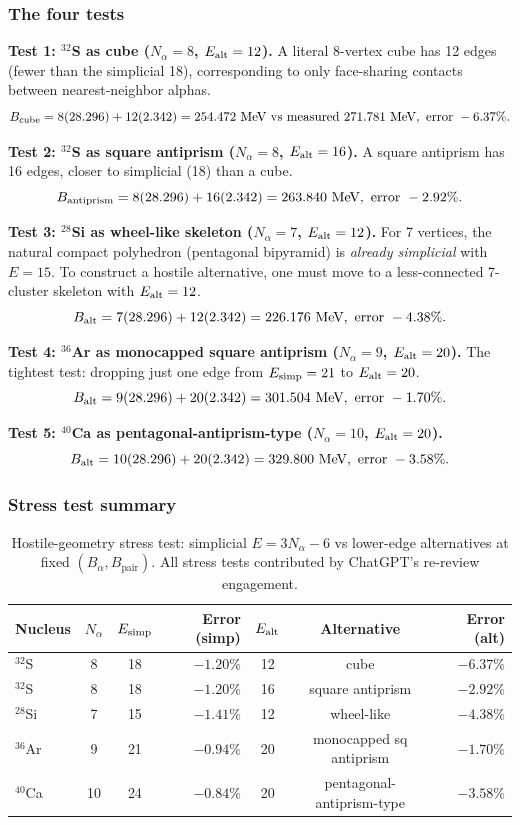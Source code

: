 \documentclass[11pt,letterpaper]{article}
\newcommand{\Bpair}{B_{\mathrm{pair}}}
\newcommand{\Balpha}{B_{\alpha}}
\newcommand{\Nalpha}{N_{\alpha}}
\begin{document}
\subsubsection{The four tests}

\textbf{Test 1: ${}^{32}$S as cube ($\Nalpha = 8$, $E_{\rm alt} = 12$).} A literal 8-vertex cube has 12 edges (fewer than the simplicial 18), corresponding to only face-sharing contacts between nearest-neighbor alphas.
\[
B_{\rm cube} = 8(28.296) + 12(2.342) = 254.472 \text{ MeV vs measured } 271.781 \text{ MeV}, \text{ error } -6.37\%.
\]

\textbf{Test 2: ${}^{32}$S as square antiprism ($\Nalpha = 8$, $E_{\rm alt} = 16$).} A square antiprism has 16 edges, closer to simplicial (18) than a cube.
\[
B_{\rm antiprism} = 8(28.296) + 16(2.342) = 263.840 \text{ MeV}, \text{ error } -2.92\%.
\]

\textbf{Test 3: ${}^{28}$Si as wheel-like skeleton ($\Nalpha = 7$, $E_{\rm alt} = 12$).} For 7 vertices, the natural compact polyhedron (pentagonal bipyramid) is \emph{already simplicial} with $E = 15$. To construct a hostile alternative, one must move to a less-connected 7-cluster skeleton with $E_{\rm alt} = 12$.
\[
B_{\rm alt} = 7(28.296) + 12(2.342) = 226.176 \text{ MeV}, \text{ error } -4.38\%.
\]

\textbf{Test 4: ${}^{36}$Ar as monocapped square antiprism ($\Nalpha = 9$, $E_{\rm alt} = 20$).} The tightest test: dropping just one edge from $E_{\rm simp} = 21$ to $E_{\rm alt} = 20$.
\[
B_{\rm alt} = 9(28.296) + 20(2.342) = 301.504 \text{ MeV}, \text{ error } -1.70\%.
\]

\textbf{Test 5: ${}^{40}$Ca as pentagonal-antiprism-type ($\Nalpha = 10$, $E_{\rm alt} = 20$).}
\[
B_{\rm alt} = 10(28.296) + 20(2.342) = 329.800 \text{ MeV}, \text{ error } -3.58\%.
\]

\subsubsection{Stress test summary}

\begin{table}[H]
\centering
\caption{Hostile-geometry stress test: simplicial $E = 3\Nalpha - 6$ vs lower-edge alternatives at fixed $(\Balpha, \Bpair)$. All stress tests contributed by ChatGPT's re-review engagement.}
\label{tab:stress_test}
\begin{tabular}{@{}lccrccr@{}}
\toprule
Nucleus & $\Nalpha$ & $E_{\rm simp}$ & Error (simp) & $E_{\rm alt}$ & Alternative & Error (alt) \\
\midrule
${}^{32}$S  & 8  & 18 & $-1.20\%$ & 12 & cube             & $-6.37\%$ \\
${}^{32}$S  & 8  & 18 & $-1.20\%$ & 16 & square antiprism & $-2.92\%$ \\
${}^{28}$Si & 7  & 15 & $-1.41\%$ & 12 & wheel-like       & $-4.38\%$ \\
${}^{36}$Ar & 9  & 21 & $-0.94\%$ & 20 & monocapped sq antiprism & $-1.70\%$ \\
${}^{40}$Ca & 10 & 24 & $-0.84\%$ & 20 & pentagonal-antiprism-type & $-3.58\%$ \\
\bottomrule
\end{tabular}
\end{table}
\end{document}
